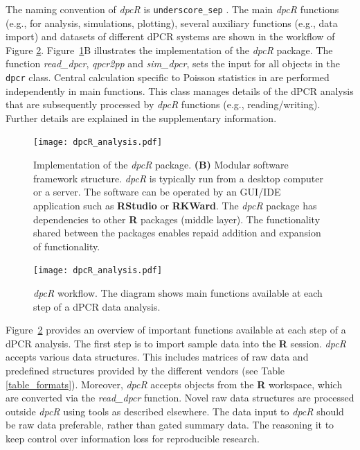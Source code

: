 \documentclass[a4,center,fleqn]{NAR}
\begin{document}
The naming convention of \textit{dpcR} is \texttt{underscore\_sep} 
\cite{Baaaath_2012}. The main \textit{dpcR} functions (e.g., for analysis, 
simulations, plotting), several auxiliary functions (e.g., data import) and 
datasets of different dPCR systems are shown in the workflow of Figure 
\ref{workflow}. Figure~\ref{dpcR_framework}B illustrates the implementation of 
the \textit{dpcR} package. The function \textit{read\_dpcr}, \textit{qpcr2pp} 
and \textit{sim\_dpcr}, sets the input for all objects in the \texttt{dpcr} 
class. Central calculation specific to Poisson statistics in are performed 
independently in main functions. This class manages details of the dPCR analysis 
that are subsequently processed by \textit{dpcR} functions (e.g., 
reading/writing). Further details are explained in the supplementary 
information.

\begin{figure}[t]
\begin{center}
\texttt{[image: dpcR\_analysis.pdf]}
\end{center}
\caption{Implementation of the \textit{dpcR} package. \textbf{(B)} Modular software 
framework structure. \textit{dpcR} is typically run from a desktop computer or a 
server. The software can be operated by an GUI/IDE application such as 
\textbf{RStudio} or \textbf{RKWard}. The \textit{dpcR} package has dependencies 
to other \textbf{R} packages (middle layer). The functionality shared between 
the packages enables repaid addition and expansion of functionality.}
\label{dpcR_framework}
\end{figure}

\begin{figure}[t]
\begin{center}
\texttt{[image: dpcR\_analysis.pdf]}
\end{center}
\caption{\textit{dpcR} workflow. The diagram shows main functions 
available at each step of a dPCR data analysis.}
\label{workflow}
\end{figure}

Figure~\ref{workflow} provides an overview of important functions available at 
each step of a dPCR analysis. The first step is to import sample data into the 
\textbf{R} session. \textit{dpcR} accepts various data structures. This includes 
matrices of raw data and predefined structures provided by the different vendors 
(see Table \ref{table_formats}). Moreover, \textit{dpcR} accepts objects from 
the \textbf{R} workspace, which are converted via the \textit{read\_dpcr} 
function. Novel raw data structures are processed outside \textit{dpcR} using 
tools as described elsewhere. The data input to \textit{dpcR} should be raw data 
preferable, rather than gated summary data. The reasoning it to keep control 
over information loss for reproducible research.
\end{document}
